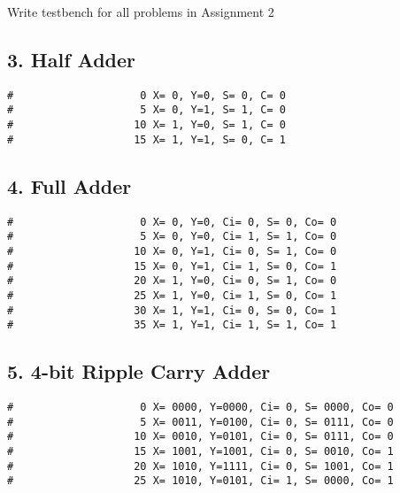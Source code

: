 \documentclass{vhdl-assignment}
\begin{document}
\begin{problem}{Write testbench for all problems in Assignment 2}
    \pagebreak
    \subsection*{3. Half Adder}
\begin{lstlisting}[caption=Half Adder Testbench Output]
#                    0 X= 0, Y=0, S= 0, C= 0
#                    5 X= 0, Y=1, S= 1, C= 0
#                   10 X= 1, Y=0, S= 1, C= 0
#                   15 X= 1, Y=1, S= 0, C= 1
\end{lstlisting}

    \subsection*{4. Full Adder}
\begin{lstlisting}[caption=Full Adder Testbench Output]
#                    0 X= 0, Y=0, Ci= 0, S= 0, Co= 0
#                    5 X= 0, Y=0, Ci= 1, S= 1, Co= 0
#                   10 X= 0, Y=1, Ci= 0, S= 1, Co= 0
#                   15 X= 0, Y=1, Ci= 1, S= 0, Co= 1
#                   20 X= 1, Y=0, Ci= 0, S= 1, Co= 0
#                   25 X= 1, Y=0, Ci= 1, S= 0, Co= 1
#                   30 X= 1, Y=1, Ci= 0, S= 0, Co= 1
#                   35 X= 1, Y=1, Ci= 1, S= 1, Co= 1    
\end{lstlisting}
    
    \subsection*{5. 4-bit Ripple Carry Adder}
\begin{lstlisting}[caption=Full Adder Testbench Output]
#                    0 X= 0000, Y=0000, Ci= 0, S= 0000, Co= 0
#                    5 X= 0011, Y=0100, Ci= 0, S= 0111, Co= 0
#                   10 X= 0010, Y=0101, Ci= 0, S= 0111, Co= 0
#                   15 X= 1001, Y=1001, Ci= 0, S= 0010, Co= 1
#                   20 X= 1010, Y=1111, Ci= 0, S= 1001, Co= 1
#                   25 X= 1010, Y=0101, Ci= 1, S= 0000, Co= 1   
\end{lstlisting}
\end{problem}
\end{document}
